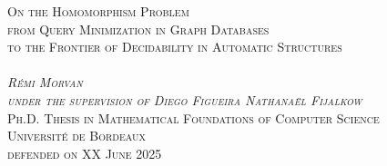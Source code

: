 \begin{titlepage}
\begin{center}
  \Huge\scshape{%
  On the Homomorphism Problem}\\[.5cm]
  \Large\scshape{%
  from Query Minimization in Graph Databases\\[.2cm]to the Frontier of Decidability in Automatic Structures}\\
  \vspace{5cm}
  \\
  \vfill
  \normalfont%
  \huge{}\emph{Rémi Morvan}\\
  \large\emph{under the supervision of 
  Diego Figueira {\color{maincolor}\fancyand} Nathanaël Fijalkow}\\[1cm]
  \normalfont\Large\scshape
  Ph.D. Thesis in Mathematical Foundations of Computer Science\\
  \textcolor{maincolor}{Université de Bordeaux}\\
  defended on XX June 2025
\end{center}
\end{titlepage}
\restoregeometry
